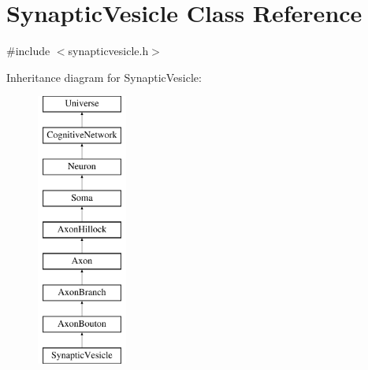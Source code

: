 \hypertarget{classSynapticVesicle}{}\section{Synaptic\+Vesicle Class Reference}
\label{classSynapticVesicle}


{\ttfamily \#include $<$synapticvesicle.\+h$>$}

Inheritance diagram for Synaptic\+Vesicle\+:\begin{figure}[H]
\begin{center}
\leavevmode
\includegraphics[height=9.000000cm]{classSynapticVesicle}
\end{center}
\end{figure}
